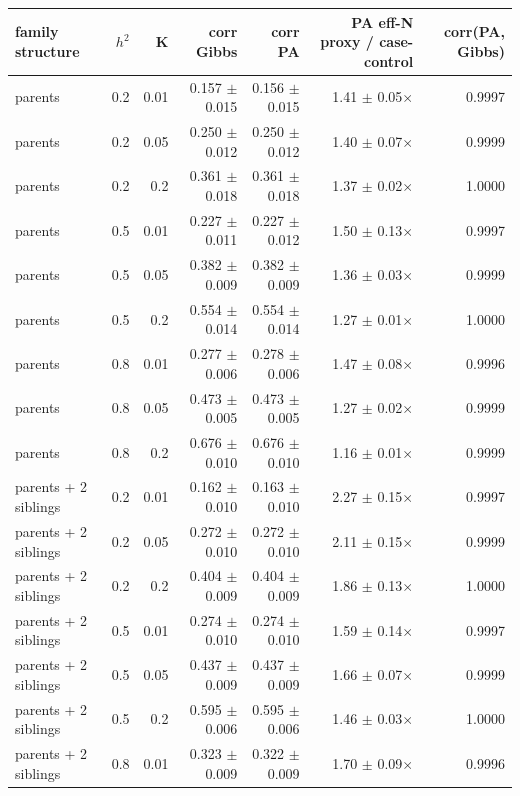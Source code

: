 \begin{tabular}{lrrrrrr}
\toprule
family structure & $h^2$ & K & corr Gibbs & corr PA & PA eff-N proxy / case-control & corr(PA, Gibbs) \\
\midrule
parents & 0.2 & 0.01 & 0.157 $\pm$ 0.015 & 0.156 $\pm$ 0.015 & 1.41 $\pm$ 0.05$\times$ & 0.9997 \\
parents & 0.2 & 0.05 & 0.250 $\pm$ 0.012 & 0.250 $\pm$ 0.012 & 1.40 $\pm$ 0.07$\times$ & 0.9999 \\
parents & 0.2 & 0.2 & 0.361 $\pm$ 0.018 & 0.361 $\pm$ 0.018 & 1.37 $\pm$ 0.02$\times$ & 1.0000 \\
parents & 0.5 & 0.01 & 0.227 $\pm$ 0.011 & 0.227 $\pm$ 0.012 & 1.50 $\pm$ 0.13$\times$ & 0.9997 \\
parents & 0.5 & 0.05 & 0.382 $\pm$ 0.009 & 0.382 $\pm$ 0.009 & 1.36 $\pm$ 0.03$\times$ & 0.9999 \\
parents & 0.5 & 0.2 & 0.554 $\pm$ 0.014 & 0.554 $\pm$ 0.014 & 1.27 $\pm$ 0.01$\times$ & 1.0000 \\
parents & 0.8 & 0.01 & 0.277 $\pm$ 0.006 & 0.278 $\pm$ 0.006 & 1.47 $\pm$ 0.08$\times$ & 0.9996 \\
parents & 0.8 & 0.05 & 0.473 $\pm$ 0.005 & 0.473 $\pm$ 0.005 & 1.27 $\pm$ 0.02$\times$ & 0.9999 \\
parents & 0.8 & 0.2 & 0.676 $\pm$ 0.010 & 0.676 $\pm$ 0.010 & 1.16 $\pm$ 0.01$\times$ & 0.9999 \\
parents + 2 siblings & 0.2 & 0.01 & 0.162 $\pm$ 0.010 & 0.163 $\pm$ 0.010 & 2.27 $\pm$ 0.15$\times$ & 0.9997 \\
parents + 2 siblings & 0.2 & 0.05 & 0.272 $\pm$ 0.010 & 0.272 $\pm$ 0.010 & 2.11 $\pm$ 0.15$\times$ & 0.9999 \\
parents + 2 siblings & 0.2 & 0.2 & 0.404 $\pm$ 0.009 & 0.404 $\pm$ 0.009 & 1.86 $\pm$ 0.13$\times$ & 1.0000 \\
parents + 2 siblings & 0.5 & 0.01 & 0.274 $\pm$ 0.010 & 0.274 $\pm$ 0.010 & 1.59 $\pm$ 0.14$\times$ & 0.9997 \\
parents + 2 siblings & 0.5 & 0.05 & 0.437 $\pm$ 0.009 & 0.437 $\pm$ 0.009 & 1.66 $\pm$ 0.07$\times$ & 0.9999 \\
parents + 2 siblings & 0.5 & 0.2 & 0.595 $\pm$ 0.006 & 0.595 $\pm$ 0.006 & 1.46 $\pm$ 0.03$\times$ & 1.0000 \\
parents + 2 siblings & 0.8 & 0.01 & 0.323 $\pm$ 0.009 & 0.322 $\pm$ 0.009 & 1.70 $\pm$ 0.09$\times$ & 0.9996 \\

\end{tabular}
